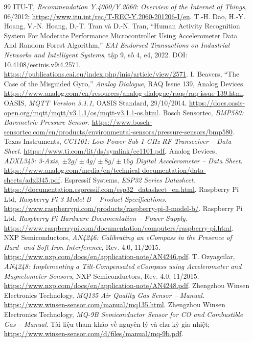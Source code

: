 \clearpage
{}
\begin{thebibliography}{99}
 ITU-T, \textit{Recommendation Y.4000/Y.2060: Overview of the Internet of Things}, 06/2012; \url{https://www.itu.int/rec/T-REC-Y.2060-201206-I/en}.
 T.-H. Dao, H.-Y. Hoang, V.-N. Hoang, D.-T. Tran và D.-N. Tran, ``Human Activity Recognition System For Moderate Performance Microcontroller Using Accelerometer Data And Random Forest Algorithm,'' \textit{EAI Endorsed Transactions on Industrial Networks and Intelligent Systems}, tập 9, số 4, e4, 2022. DOI: 10.4108/eetinis.v9i4.2571. \url{https://publications.eai.eu/index.php/inis/article/view/2571}.
 I. Beavers, ``The Case of the Misguided Gyro,'' \textit{Analog Dialogue}, RAQ Issue 139, Analog Devices. \url{https://www.analog.com/en/resources/analog-dialogue/raqs/raq-issue-139.html}.
 OASIS, \textit{MQTT Version 3.1.1}, OASIS Standard, 29/10/2014. \url{https://docs.oasis-open.org/mqtt/mqtt/v3.1.1/os/mqtt-v3.1.1-os.html}.
 Bosch Sensortec, \textit{BMP580: Barometric Pressure Sensor}. \url{https://www.bosch-sensortec.com/en/products/environmental-sensors/pressure-sensors/bmp580}.
 Texas Instruments, \textit{CC1101: Low-Power Sub-1 GHz RF Transceiver -- Data Sheet}. \url{https://www.ti.com/lit/ds/symlink/cc1101.pdf}.
 Analog Devices, \textit{ADXL345: 3-Axis, $\pm2g/\pm4g/\pm8g/\pm16g$ Digital Accelerometer -- Data Sheet}. \url{https://www.analog.com/media/en/technical-documentation/data-sheets/adxl345.pdf}.
 Espressif Systems, \textit{ESP32 Series Datasheet}. \url{https://documentation.espressif.com/esp32_datasheet_en.html}.
 Raspberry Pi Ltd, \textit{Raspberry Pi 3 Model B -- Product Specifications}. \url{https://www.raspberrypi.com/products/raspberry-pi-3-model-b/}.
 Raspberry Pi Ltd, \textit{Raspberry Pi Hardware Documentation -- Power Supply}. \url{https://www.raspberrypi.com/documentation/computers/raspberry-pi.html}.
 NXP Semiconductors, \textit{AN4246: Calibrating an eCompass in the Presence of Hard- and Soft-Iron Interference}, Rev. 4.0, 11/2015. \url{https://www.nxp.com/docs/en/application-note/AN4246.pdf}.
 T. Ozyagcilar, \textit{AN4248: Implementing a Tilt-Compensated eCompass using Accelerometer and Magnetometer Sensors}, NXP Semiconductors, Rev. 4.0, 11/2015. \url{https://www.nxp.com/docs/en/application-note/AN4248.pdf}.
 Zhengzhou Winsen Electronics Technology, \textit{MQ135 Air Quality Gas Sensor -- Manual}. \url{https://www.winsen-sensor.com/manual/mq135.html}.
 Zhengzhou Winsen Electronics Technology, \textit{MQ-9B Semiconductor Sensor for CO and Combustible Gas -- Manual}. Tài liệu tham khảo về nguyên lý và chu kỳ gia nhiệt; \url{https://www.winsen-sensor.com/d/files/manual/mq-9b.pdf}.
\end{thebibliography}
